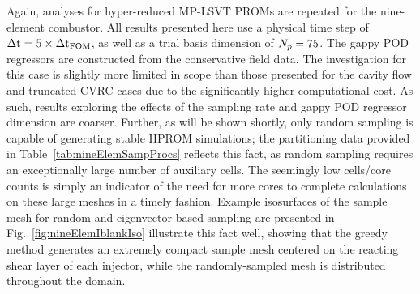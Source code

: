 Again, analyses for hyper-reduced MP-LSVT PROMs are repeated for the nine-element combustor. All results presented here use a physical time step of $\Delta \text{t} = 5 \times \Delta \text{t}_{\text{FOM}}$, as well as a trial basis dimension of $N_p = 75$. The gappy POD regressors are constructed from the conservative field data. The investigation for this case is slightly more limited in scope than those presented for the cavity flow and truncated CVRC cases due to the significantly higher computational cost. As such, results exploring the effects of the sampling rate and gappy POD regressor dimension are coarser. Further, as will be shown shortly, only random sampling is capable of generating stable HPROM simulations; the partitioning data provided in Table~\ref{tab:nineElemSampProcs} reflects this fact, as random sampling requires an exceptionally large number of auxiliary cells. The seemingly low cells/core counts is simply an indicator of the need for more cores to complete calculations on these large meshes in a timely fashion. Example isosurfaces of the sample mesh for random and eigenvector-based sampling are presented in Fig.~\ref{fig:nineElemIblankIso} illustrate this fact well, showing that the greedy method generates an extremely compact sample mesh centered on the reacting shear layer of each injector, while the randomly-sampled mesh is distributed throughout the domain.

